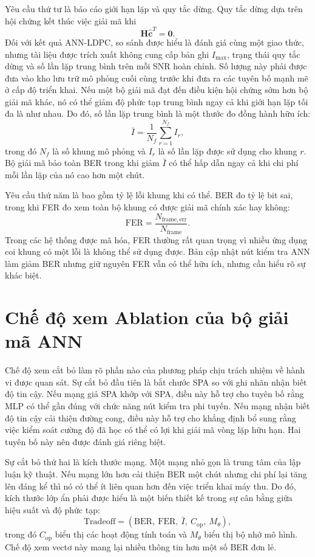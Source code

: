 Yêu cầu thứ tư là báo cáo giới hạn lặp và quy tắc dừng. Quy tắc dừng dựa trên hội chứng kết thúc việc giải mã khi
\begin{equation}
  \mathbf{H}\hat{\mathbf{c}}^T=\mathbf{0}.
\end{equation}
Đối với kết quả ANN-LDPC, so sánh được hiểu là đánh giá cùng một giao thức, nhưng tài liệu được trích xuất không cung cấp bản ghi $I_{\max}$, trạng thái quy tắc dừng và số lần lặp trung bình trên mỗi SNR hoàn chỉnh. Số lượng này phải được đưa vào kho lưu trữ mô phỏng cuối cùng trước khi đưa ra các tuyên bố mạnh mẽ ở cấp độ triển khai. Nếu một bộ giải mã đạt đến điều kiện hội chứng sớm hơn bộ giải mã khác, nó có thể giảm độ phức tạp trung bình ngay cả khi giới hạn lặp tối đa là như nhau. Do đó, số lần lặp trung bình là một thước đo đồng hành hữu ích:
\begin{equation}
  \bar{I}=\frac{1}{N_f}\sum_{r=1}^{N_f}I_r,
\end{equation}
trong đó $N_f$ là số khung mô phỏng và $I_r$ là số lần lặp được sử dụng cho khung $r$. Bộ giải mã bảo toàn BER trong khi giảm $\bar{I}$ có thể hấp dẫn ngay cả khi chi phí mỗi lần lặp của nó cao hơn một chút.

Yêu cầu thứ năm là bao gồm tỷ lệ lỗi khung khi có thể. BER đo tỷ lệ bit sai, trong khi FER đo xem toàn bộ khung có được giải mã chính xác hay không:
\begin{equation}
  \mathrm{FER}=\frac{N_{\mathrm{frame,err}}}{N_{\mathrm{frame}}}.
\end{equation}
Trong các hệ thống được mã hóa, FER thường rất quan trọng vì nhiều ứng dụng coi khung có một lỗi là không thể sử dụng được. Bản cập nhật nút kiểm tra ANN làm giảm BER nhưng giữ nguyên FER vẫn có thể hữu ích, nhưng cần hiểu rõ sự khác biệt.

\section{Chế độ xem Ablation của bộ giải mã ANN}
Chế độ xem cắt bỏ làm rõ phần nào của phương pháp chịu trách nhiệm về hành vi được quan sát. Sự cắt bỏ đầu tiên là bắt chước SPA so với ghi nhãn nhận biết độ tin cậy. Nếu mạng giả SPA khớp với SPA, điều này hỗ trợ cho tuyên bố rằng MLP có thể gần đúng với chức năng nút kiểm tra phi tuyến. Nếu mạng nhận biết độ tin cậy cải thiện đường cong, điều này hỗ trợ cho khẳng định bổ sung rằng việc kiểm soát cường độ đã học có thể có lợi khi giải mã vòng lặp hữu hạn. Hai tuyên bố này nên được đánh giá riêng biệt.

Sự cắt bỏ thứ hai là kích thước mạng. Một mạng nhỏ gọn là trung tâm của lập luận kỹ thuật. Nếu mạng lớn hơn cải thiện BER một chút nhưng chi phí lại tăng lên đáng kể thì nó có thể ít liên quan hơn đến việc triển khai máy thu. Do đó, kích thước lớp ẩn phải được hiểu là một biến thiết kế trong sự cân bằng giữa hiệu suất và độ phức tạp:
\begin{equation}
  \mathrm{Tradeoff}=
  \left(\mathrm{BER},\ \mathrm{FER},\ \bar{I},\ C_{\mathrm{op}},\ M_{\theta}\right),
\end{equation}
trong đó $C_{\mathrm{op}}$ biểu thị các hoạt động tính toán và $M_{\theta}$ biểu thị bộ nhớ mô hình. Chế độ xem vectơ này mang lại nhiều thông tin hơn một số BER đơn lẻ.

